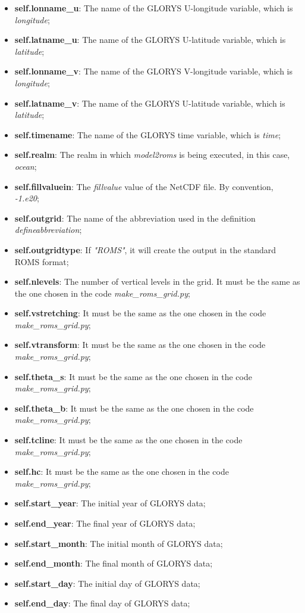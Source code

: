 \begin{itemize}
    \item \textbf{self.lonname\_u}: The name of the GLORYS U-longitude variable, which is \textit{longitude};
    \item \textbf{self.latname\_u}: The name of the GLORYS U-latitude variable, which is \textit{latitude};
    \item \textbf{self.lonname\_v}: The name of the GLORYS V-longitude variable, which is \textit{longitude};
    \item \textbf{self.latname\_v}: The name of the GLORYS U-latitude variable, which is \textit{latitude};
    \item \textbf{self.timename}: The name of the GLORYS time variable, which is \textit{time};
    \item \textbf{self.realm}: The realm in which \textit{model2roms} is being executed, in this case, \textit{ocean};
    \item \textbf{self.fillvaluein}: The \textit{fillvalue} value of the NetCDF file. By convention, \textit{-1.e20};
    \item \textbf{self.outgrid}: The name of the abbreviation used in the definition \textit{defineabbreviation};
    \item \textbf{self.outgridtype}: If \textit{"ROMS"}, it will create the output in the standard ROMS format;
    \item \textbf{self.nlevels}: The number of vertical levels in the grid. It must be the same as the one chosen in the code \textit{make\_roms\_grid.py};
    \item \textbf{self.vstretching}: It must be the same as the one chosen in the code \textit{make\_roms\_grid.py};
    \item \textbf{self.vtransform}: It must be the same as the one chosen in the code \textit{make\_roms\_grid.py};
    \item \textbf{self.theta\_s}: It must be the same as the one chosen in the code \textit{make\_roms\_grid.py};
    \item \textbf{self.theta\_b}: It must be the same as the one chosen in the code \textit{make\_roms\_grid.py};
    \item \textbf{self.tcline}: It must be the same as the one chosen in the code \textit{make\_roms\_grid.py};   
    \item \textbf{self.hc}: It must be the same as the one chosen in the code \textit{make\_roms\_grid.py};
    \item \textbf{self.start\_year}: The initial year of GLORYS data;
    \item \textbf{self.end\_year}: The final year of GLORYS data;
    \item \textbf{self.start\_month}: The initial month of GLORYS data;
    \item \textbf{self.end\_month}: The final month of GLORYS data;
    \item \textbf{self.start\_day}: The initial day of GLORYS data;
    \item \textbf{self.end\_day}: The final day of GLORYS data;
\end{itemize}
\bigskip

